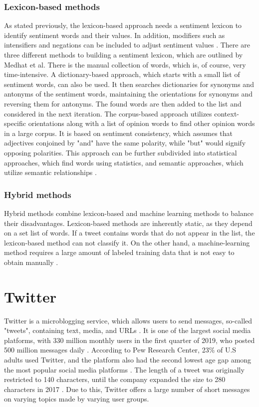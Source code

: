 \subsubsection{Lexicon-based methods}
As stated previously, the lexicon-based approach needs a sentiment lexicon to identify sentiment words and their values. In addition, modifiers such as intensifiers and negations can be included to adjust sentiment values \cite{liu_2015}. There are three different methods to building a sentiment lexicon, which are outlined by Medhat et al. There is the manual collection of words, which is, of course, very time-intensive. A dictionary-based approach, which starts with a small list of sentiment words, can also be used. It then searches dictionaries for synonyms and antonyms of the sentiment words, maintaining the orientations for synonyms and reversing them for antonyms. The found words are then added to the list and considered in the next iteration. The corpus-based approach utilizes context-specific orientations along with a list of opinion words to find other opinion words in a large corpus. It is based on sentiment consistency, which assumes that adjectives conjoined by "and" have the same polarity, while "but" would signify opposing polarities. This approach can be further subdivided into statistical approaches, which find words using statistics, and semantic approaches, which utilize semantic relationships \cite{MEDHAT20141093}.

\subsubsection{Hybrid methods}
Hybrid methods combine lexicon-based and machine learning methods to balance their disadvantages. Lexicon-based methods are inherently static, as they depend on a set list of words. If a tweet contains words that do not appear in the list, the lexicon-based method can not classify it. On the other hand, a machine-learning method requires a large amount of labeled training data that is not easy to obtain manually \cite{DBLP:journals/csur/GiachanouC16}.


\section{Twitter}
Twitter is a microblogging service, which allows users to send messages, so-called "tweets", containing text, media, and URLs \cite{DBLP:journals/csur/GiachanouC16}. It is one of the largest social media platforms, with 330 million monthly users in the first quarter of 2019, who posted 500 million messages daily \cite{twitter:users}. According to Pew Research Center, 23\% of U.S adults used Twitter, and the platform also had the second lowest age gap among the most popular social media platforms \cite{pew:socialmedia}. The length of a tweet was originally restricted to 140 characters, until the company expanded the size to 280 characters in 2017 \cite{twitter:characters}. Due to this, Twitter offers a large number of short messages on varying topics made by varying user groups. 

